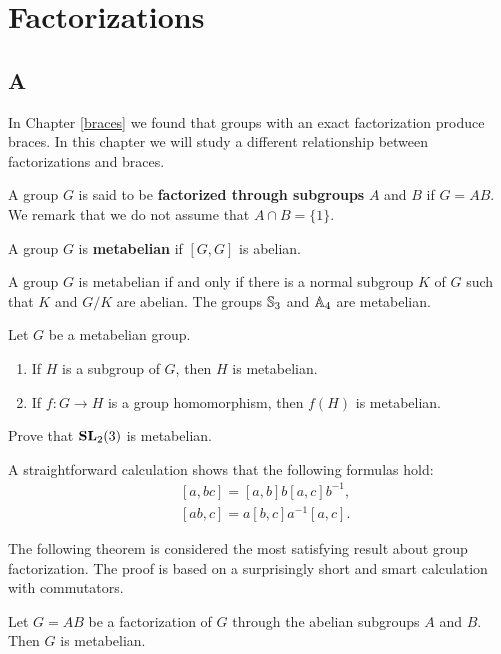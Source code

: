\chapter{Factorizations}
\label{factorizations}

\section*{{{\thesection}A}}

In Chapter \ref{braces} we found that groups with an exact factorization 
produce braces. In this chapter we will study a different relationship between
factorizations and braces. 

A group $G$ is said to be 
\textbf{factorized through subgroups} $A$ and $B$ if $G=AB$. We remark that we do not assume that
$A\cap B=\{1\}$. 

\begin{definition}
	A group $G$ is \textbf{metabelian} if $[G,G]$ is abelian. 
\end{definition}

A group $G$ is metabelian if and only if there is a normal subgroup 
$K$ of $G$ such that $K$ and $G/K$ are abelian. 
The groups $\mathbb{S}_3$ and $\mathbb{A}_4$ are metabelian. 

\begin{exercise}
	Let $G$ be a metabelian group.  
	\begin{enumerate}
		\item If $H$ is a subgroup of $G$, then $H$ is metabelian. 
		\item If $f\colon G\to H$ is a group homomorphism, then $f(H)$ is metabelian.
	\end{enumerate}
\end{exercise}

\begin{exercise}
	Prove that $\mathbf{SL}_2(3)$ is metabelian. 
\end{exercise}

A straightforward calculation shows that 
the following formulas hold: 
\begin{align*}
&[a,bc]=[a,b]b[a,c]b^{-1},\\ 
&[ab,c]=a[b,c]a^{-1}[a,c].
\end{align*}

The following theorem is considered the most satisfying result about group factorization. The proof
is based on a surprisingly short and smart calculation with commutators. 

\begin{theorem}[It\^o]
	\label{theorem:Ito}
	Let $G=AB$ be a factorization of $G$ through the abelian subgroups $A$ and $B$. 
	Then $G$ is metabelian.
\end{theorem}

